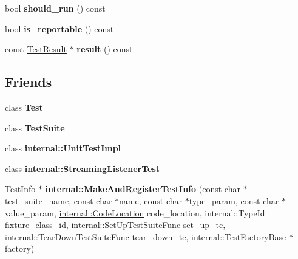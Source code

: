 \begin{DoxyCompactItemize}
\mbox{\label{classtesting_1_1TestInfo_a866e33b5bc5ab2a6e5375fc7d3af0f96}} 
bool {\bfseries should\+\_\+run} () const
\item 
\mbox{\label{classtesting_1_1TestInfo_a63e7042028b0b846f4b5a1e5bcffc079}} 
bool {\bfseries is\+\_\+reportable} () const
\item 
\mbox{\label{classtesting_1_1TestInfo_aee8cb884c95cd446129aba936b4159e0}} 
const \mbox{\hyperlink{classtesting_1_1TestResult}{Test\+Result}} $\ast$ {\bfseries result} () const
\end{DoxyCompactItemize}
\subsection*{Friends}
\begin{DoxyCompactItemize}
\item 
\mbox{\label{classtesting_1_1TestInfo_a5b78b1c2e1fa07ffed92da365593eaa4}} 
class {\bfseries Test}
\item 
\mbox{\label{classtesting_1_1TestInfo_ab9aaba231fd11196425e75caf709bfc6}} 
class {\bfseries Test\+Suite}
\item 
\mbox{\label{classtesting_1_1TestInfo_acc0a5e7573fd6ae7ad1878613bb86853}} 
class {\bfseries internal\+::\+Unit\+Test\+Impl}
\item 
\mbox{\label{classtesting_1_1TestInfo_adc037d188dab349a94868991955c9cd4}} 
class {\bfseries internal\+::\+Streaming\+Listener\+Test}
\item 
\mbox{\label{classtesting_1_1TestInfo_a63d61c7ffd0423b1d3615f0ff5f2040e}} 
\mbox{\hyperlink{classtesting_1_1TestInfo}{Test\+Info}} $\ast$ {\bfseries internal\+::\+Make\+And\+Register\+Test\+Info} (const char $\ast$test\+\_\+suite\+\_\+name, const char $\ast$name, const char $\ast$type\+\_\+param, const char $\ast$value\+\_\+param, \mbox{\hyperlink{structtesting_1_1internal_1_1CodeLocation}{internal\+::\+Code\+Location}} code\+\_\+location, internal\+::\+Type\+Id fixture\+\_\+class\+\_\+id, internal\+::\+Set\+Up\+Test\+Suite\+Func set\+\_\+up\+\_\+tc, internal\+::\+Tear\+Down\+Test\+Suite\+Func tear\+\_\+down\+\_\+tc, \mbox{\hyperlink{classtesting_1_1internal_1_1TestFactoryBase}{internal\+::\+Test\+Factory\+Base}} $\ast$factory)
\end{DoxyCompactItemize}


